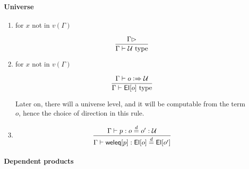 \documentclass[11pt]{article}
\newcommand{\eqd}{\stackrel{d}{=}}
\newcommand{\Eu}{{\cal U}}
\newcommand{\synth}{\vcentcolon\Rightarrow}
\newcommand{\Type}{\mathop{{\, \rm type}}}
\newcommand{\ha}[2]{#1[#2]}
\newcommand{\El}{{\sf El}}
\newcommand{\weleq}{{\sf weleq}}
\begin{document}
\paragraph{Universe}

\begin{enumerate}

\item for $x$ not in $v(\Gamma)$

$$\frac{\Gamma\rhd}{\Gamma \vdash \Eu\Type}$$

\item for $x$ not in $v(\Gamma)$

$$\frac{\Gamma\vdash o \synth \Eu}{\Gamma \vdash \ha\El{o}\Type}$$

Later on, there will a universe level, and it will be computable from the
term $o$, hence the choice of direction in this rule.

\item 

$$\frac{\Gamma\vdash p : o \eqd o' : \Eu}{\Gamma\vdash \ha\weleq{p} : \ha\El{o} \eqd \ha\El{o'}}$$

\end{enumerate}

\paragraph{Dependent products}
\end{document}
